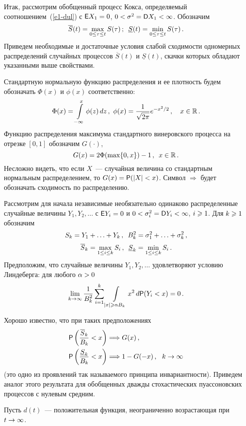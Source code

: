 \begin{multicols}{2}
Итак, рассмотрим обобщенный процесс Кокса, определяемый соотношением~(\ref{e1-dul}) 
с ${\sf E}X_1\hm=0$, $0\hm<\sigma^2\hm={\sf D}X_1\hm<\infty$. Обозначим
$$
\overline S(t)=\max\limits_{0\le\tau\le t}S(\tau)\,;\enskip \underline
S(t)=\min\limits_{0\le\tau \le t}S(\tau)\,.
$$
Приведем необходимые и достаточные условия слабой сходимости
одномерных распределений случайных процессов $\overline S(t)$ и
$\underline S(t)$, скачки которых обладают указанными выше
свойствами.

Стандартную нормальную функцию распределения и ее плотность будем
обозначать $\Phi(x)$ и $\phi(x)$ соответственно:
$$
\Phi(x)=\int\limits_{-\infty}^{x}\phi(z)\,dz\,,\ 
\phi(x)=\fr{1}{\sqrt{2\pi}}e^{-x^2/2}\,,\ \ \ x\in\r\,.
$$
Функцию распределения максимума стандартного винеровского процесса
на отрезке $[0,1]$ обозначим $G(\cdot)$,
$$
G(x)=2\Phi(\max\{0,x\})-1\,, \enskip  x\in\mathbb{R}\,.
$$
Несложно видеть, что если $X$~--- случайная величина со стандартным
нормальным распределением, то $G(x)\hm={\sf P}(|X|<x)$. Символ
$\Longrightarrow$ будет обозначать сходимость по распределению.

Рассмотрим для начала независимые необязательно одинаково
распределенные случайные величины $Y_1,Y_2,\ldots$ с ${\sf
E}Y_i\hm=0$ и $0\hm<\sigma^2_i\hm={\sf D}Y_i\hm<\infty$, $i\hm\geqslant 1$. Для $k\hm\geqslant
1$ обозначим
$$
S_k=Y_1+\ldots+Y_k\,, \enskip B^2_k=\sigma^2_1+\ldots+\sigma^2_k\,,
$$
$$
\overline S_k=\max\limits_{1\le i\le k}S_i\,,\enskip \underline
S_k=\min_{1\le i\le k}S_i\,.
$$
Предположим, что случайные величины $Y_1,Y_2,\ldots$ удовлетворяют
условию Линдеберга: для любого $\alpha\hm>0$
$$
\lim\limits_{k\to\infty}\displaystyle\frac{\displaystyle 1\mathstrut}{\displaystyle B^2_k\mathstrut}\sum\limits_{i=1}^{k}\int\limits_{|x|\geqslant \alpha
B_k}^{} x^2\,d{\sf P}(Y_i<x)=0\,.
$$

Хорошо известно, что при таких предполо\-же\-ниях
\begin{align*}
{\sf P}\left(\displaystyle\frac{\displaystyle \overline S_k\mathstrut}{\displaystyle B_k\mathstrut}<x\right)&\Longrightarrow
G(x)\,,\\
{\sf P}\left(\displaystyle\frac{\displaystyle \underline
S_k\mathstrut}{\displaystyle B_k\mathstrut}<x\right)&\Longrightarrow 1-G(-x)\,,\ \ k\to\infty
\end{align*}
(это одно из проявлений так называемого принципа инвариантности).
Приведем аналог этого результата для обобщенных дважды
стохастических пуассоновских процессов с нулевым средним.

Пусть $d(t)$~--- положительная функция, неограниченно возрастающая
при $t\hm\to\infty$.

\medskip


\end{multicols}
